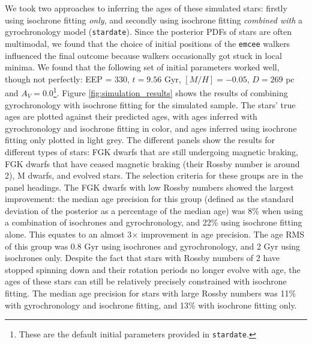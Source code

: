 \documentclass[useAMS, usenatbib, preprint, 12pt]{aastex}
\newcommand{\sd}{{\tt stardate}}
\begin{document}
We took two approaches to inferring the ages of these simulated stars:
firstly using isochrone fitting {\it only}, and secondly using isochrone
fitting {\it combined with} a gyrochronology model (\sd).
Since the posterior PDFs of stars are often multimodal, we found that the
choice of initial positions of the {\tt emcee} walkers influenced the final
outcome because walkers occasionally got stuck in local minima.
We found that the following set of initial parameters worked well, though not
perfectly: EEP = 330, $t = 9.56$ Gyr, $[M/H] = -0.05$, $D = 269$ pc and $A_V =
0.0$\footnote{These are the default initial parameters provided in \sd.}.
Figure \ref{fig:simulation_results} shows the results of combining
gyrochronology with isochrone fitting for the simulated sample.
The stars' true ages are plotted against their predicted ages, with ages
inferred with gyrochronology and isochrone fitting
in color, and ages inferred using isochrone fitting only plotted in light
grey.
The different panels show the results for different types of stars: FGK
dwarfs that are still undergoing magnetic braking, FGK dwarfs that have ceased
magnetic braking (their Rossby number is around 2), M dwarfs, and evolved
stars.
The selection criteria for these groups are in the panel headings.
The FGK dwarfs with low Rossby numbers showed the largest improvement: the
median age precision for this group (defined as the standard deviation of the
posterior as a percentage of the median age) was 8\% when using a combination
of isochrones and gyrochronology, and 22\% using isochrone fitting alone.
This equates to an almost 3$\times$ improvement in age precision.
The age RMS of this group was 0.8 Gyr using isochrones and gyrochronology, and
2 Gyr using isochrones only.
Despite the fact that stars with Rossby numbers of 2 have stopped spinning
down and their rotation periods no longer evolve with age, the ages of these
stars can still be relatively precisely constrained with isochrone fitting.
The median age precision for stars with large Rossby numbers was 11\% with
gyrochronology and isochrone fitting, and 13\% with isochrone fitting only.
\end{document}
